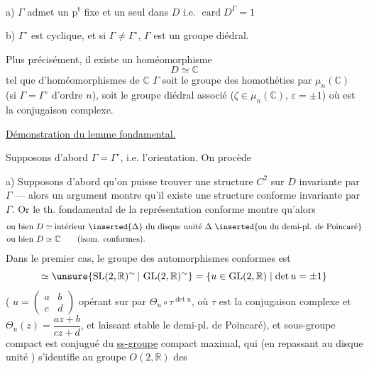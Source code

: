  a) $\Gamma$ admet un p\textsuperscript{t} fixe et un seul dans $D$ i.e. $\operatorname{card}D^\Gamma=1$

 b)  $\Gamma^\circ$ est cyclique, et si $\Gamma\ne\Gamma^\circ$, $\Gamma$ est un groupe diédral.

Plus précisément, il existe un homéomorphisme
\[
D\simeq\mathbb C
\]
tel que    d'homéomorphismes de $\mathbb C$     $\Gamma$ soit le groupe des homothéties par $\mu_n(\mathbb C)$ (si $\Gamma=\Gamma^\circ$ d'ordre $n$), soit le groupe diédral associé  ($\zeta\in\mu_n(\mathbb C)$, $\varepsilon=\pm1$) où \unsure{$\sigma$}  est la conjugaison complexe.

\uline{Démonstration du lemme fondamental.}

Supposons d'abord $\Gamma=\Gamma^\circ$, i.e.  l'orientation.  On procède






 a) Supposons d'abord qu'on puisse trouver une structure $C^2$ sur $D$ invariante par $\Gamma$ --- alors un argument  montre qu'il existe une structure conforme invariante par $\Gamma$. Or le th. fondamental de la représentation conforme montre qu'alors
\[
\begin{aligned}
&\text{ou bien }D\simeq\text{intérieur}\ \inserted{\Delta}\ \text{du disque unité }\Delta\ \inserted{\text{ou du demi-pl. de Poincaré}}\\
&\text{ou bien }D\simeq\mathbb C\qquad\text{(isom. conformes).}
\end{aligned}
\]
Dans le premier cas, le groupe des automorphismes conformes est 
\[
\simeq\unsure{\operatorname{SL}(2,\mathbb R)^\sim\,|\,\operatorname{GL}(2,\mathbb R)^\sim}
=\{u\in\operatorname{GL}(2,\mathbb R)\mid\det u=\pm1\}
\]
( $u=\left(\begin{smallmatrix}a&b\\c&d\end{smallmatrix}\right)$ opérant sur   par  $\Theta_u\circ\tau^{\det u}$, où $\tau$ est la conjugaison complexe et $\Theta_u(z)=\dfrac{az+b}{cz+d}$, et laissant stable le demi-pl. de Poincaré), et  sous-groupe compact est  conjugué du \uline{ss-groupe} compact maximal, qui (en repassant au disque unité \inserted{$\Delta$}) s'identifie au groupe $O(2,\mathbb R)$ des

